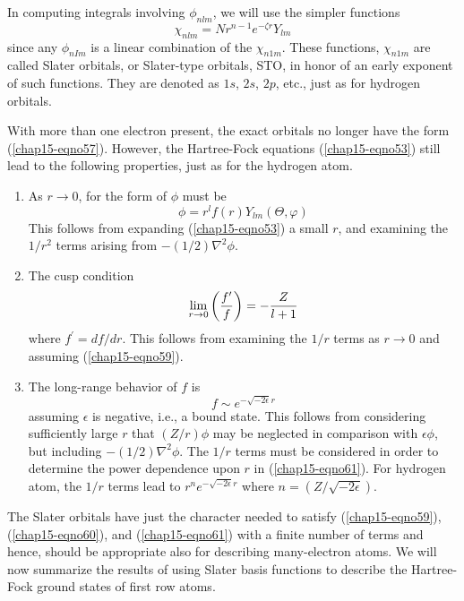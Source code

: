 In computing integrals involving $\phi_{nlm}$, we will use the 
simpler functions
\begin{equation}
\chi_{nlm} = Nr^{n-1} e^{-\zeta r} Y_{lm}
\label{chap15-eqno58}
\end{equation}
since any $\phi_{nIm}$ is a linear combination of the $\chi_{n1m}$.  These 
functions, $\chi_{n1m}$ are called Slater orbitals, or Slater-type orbitals, 
STO, in honor of an early exponent of such functions. They are denoted 
as $1s$, $2s$, $2p$, etc., just as for hydrogen orbitals.

With more than one electron present, the exact orbitals no longer have
the form (\ref{chap15-eqno57}). However, the Hartree-Fock equations
(\ref{chap15-eqno53}) still lead to the following properties, just as
for the hydrogen atom.

\begin{enumerate}
\item As $r \rightarrow 0$, for the form of $\phi$ must be
\begin{equation}
\phi = r^l f(r) Y_{lm} (\Theta , \varphi)
\label{chap15-eqno59}
\end{equation}
This follows from expanding (\ref{chap15-eqno53}) a small $r$, and
examining the $1/r^2$ terms arising from $-(1/2)\nabla^2 \phi$.

\item The cusp condition
\begin{equation}
\lim_{r \to 0} \left( {f^{\prime} \over f} \right) = - {Z \over l + 
1}
\label{chap15-eqno60}
\end{equation}
where $f^{\prime} = df/dr$. This follows from examining the $1/r$
terms as $r \rightarrow 0$ and assuming (\ref{chap15-eqno59}).

\item The long-range behavior of $f$ is
\begin{equation}
f \sim e^{-\sqrt{-2\epsilon}r}
\label{chap15-eqno61}
\end{equation}
assuming $\epsilon$ is negative, i.e., a bound state. This follows
from considering sufficiently large $r$ that $(Z/r)\phi$ may be
neglected in comparison with $\epsilon \phi$, but including
$-(1/2)\nabla^2 \phi$.  The $1/r$ terms must be considered in order to
determine the power dependence upon $r$ in (\ref{chap15-eqno61}).  For
hydrogen atom, the $1/r$ terms lead to $r^n e^{-\sqrt{-2\epsilon}r}$
where $n = (Z / \sqrt{-2\epsilon})$.
\end{enumerate}

The Slater orbitals have just the character needed to satisfy
(\ref{chap15-eqno59}), (\ref{chap15-eqno60}), and
(\ref{chap15-eqno61}) with a finite number of terms and hence, should
be appropriate also for describing many-electron atoms. We will now
summarize the results of using Slater basis functions to describe the
Hartree-Fock ground states of first row atoms.

